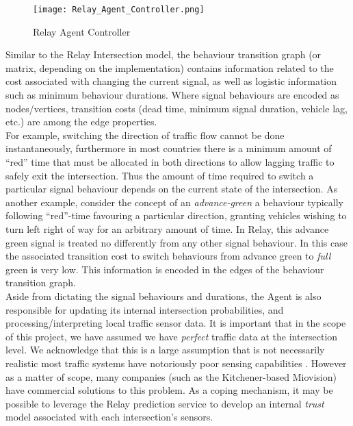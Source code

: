 \documentclass{article}
\begin{document}
\begin{figure}[!htpb]
	\caption{Relay Agent Controller}
	\texttt{[image: Relay\_Agent\_Controller.png]}
	\label{fig:Relay_Agent_Controller}
\end{figure}

Similar to the Relay Intersection model, the behaviour transition graph (or matrix, depending on the implementation) contains information related to the cost associated with changing the current signal, as well as logistic information such as minimum behaviour durations.
Where signal behaviours are encoded as nodes/vertices, transition costs (dead time, minimum signal duration, vehicle lag, etc.) are among the edge properties.\\

For example, switching the direction of traffic flow cannot be done instantaneously, furthermore in most countries there is a minimum amount of ``red'' time that must be allocated in both directions to allow lagging traffic to safely exit the intersection.
Thus the amount of time required to switch a particular signal behaviour depends on the current state of the intersection.
As another example, consider the concept of an \emph{advance-green} a behaviour typically following ``red''-time favouring a particular direction, granting vehicles wishing to turn left right of way for an arbitrary amount of time.
In Relay, this advance green signal is treated no differently from any other signal behaviour.
In this case the associated transition cost to switch behaviours from advance green to \emph{full} green is very low.
This information is encoded in the edges of the behaviour transition graph.\\

Aside from dictating the signal behaviours and durations, the Agent is also responsible for updating its internal intersection probabilities, and processing/interpreting local traffic sensor data.
It is important that in the scope of this project, we have assumed we have \emph{perfect} traffic data at the intersection level.
We acknowledge that this is a large assumption that is not necessarily realistic most traffic systems have notoriously poor sensing capabilities \cite{Miovision:2012}.
However as a matter of scope, many companies (such as the Kitchener-based Miovision) have commercial solutions to this problem.
As a coping mechanism, it may be possible to leverage the Relay prediction service to develop an internal \emph{trust} model associated with each intersection's sensors.\\
\end{document}
